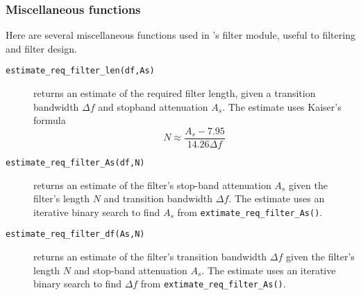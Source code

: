 \subsubsection{Miscellaneous functions}
\label{module:filter:misc}
Here are several miscellaneous functions used in \liquid's filter module,
useful to filtering and filter design.

\begin{description}
\item[{\tt estimate\_req\_filter\_len(df,As)}]
    returns an estimate of the required filter length, given a transition
    bandwidth $\Delta f$ and stopband attenuation $A_s$.
    The estimate uses Kaiser's formula \cite{Vaidyanathan:1993}
    \begin{equation}
    \label{eqn:filter:firdes:misc:estimate_N}
        N \approx \frac{
                A_s - 7.95
            }{
                14.26 \Delta f
            }
    \end{equation}

\item[{\tt estimate\_req\_filter\_As(df,N)}]
    returns an estimate of the filter's stop-band attenuation $A_s$
    given the filter's length $N$ and transition bandwidth $\Delta f$.
    The estimate uses an iterative binary search to find $A_s$ from
    {\tt extimate\_req\_filter\_As()}.

\item[{\tt estimate\_req\_filter\_df(As,N)}]
    returns an estimate of the filter's transition bandwidth $\Delta f$
    given the filter's length $N$ and stop-band attenuation $A_s$.
    The estimate uses an iterative binary search to find $\Delta f$ from
    {\tt extimate\_req\_filter\_As()}.


\end{description}

